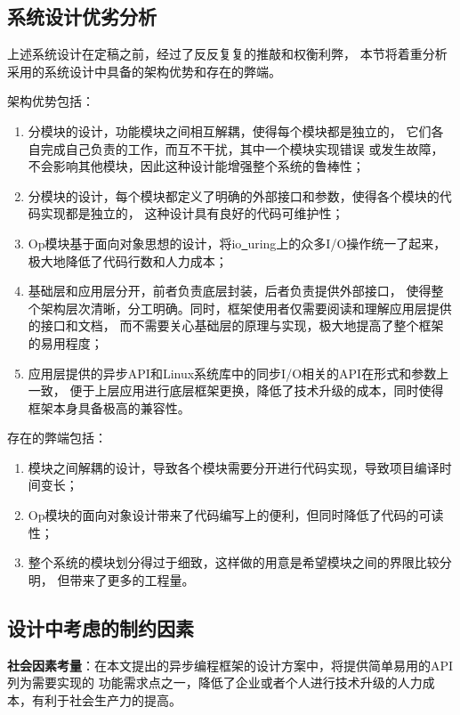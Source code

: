 \documentclass[supercite]{HustGraduPaper}
\theoremstyle{definition}
\begin{document}
\subsection{系统设计优劣分析}
上述系统设计在定稿之前，经过了反反复复的推敲和权衡利弊，
本节将着重分析采用的系统设计中具备的架构优势和存在的弊端。\par

架构优势包括：
\begin{enumerate}
  \item 分模块的设计，功能模块之间相互解耦，使得每个模块都是独立的，
    它们各自完成自己负责的工作，而互不干扰，其中一个模块实现错误
    或发生故障，不会影响其他模块，因此这种设计能增强整个系统的鲁棒性；
  \item 分模块的设计，每个模块都定义了明确的外部接口和参数，使得各个模块的代码实现都是独立的，
    这种设计具有良好的代码可维护性；
  \item Op模块基于面向对象思想的设计，将io\underline{~}uring上的众多I/O操作统一了起来，
    极大地降低了代码行数和人力成本；
  \item 基础层和应用层分开，前者负责底层封装，后者负责提供外部接口，
    使得整个架构层次清晰，分工明确。同时，框架使用者仅需要阅读和理解应用层提供的接口和文档，
    而不需要关心基础层的原理与实现，极大地提高了整个框架的易用程度；
  \item 应用层提供的异步API和Linux系统库中的同步I/O相关的API在形式和参数上一致，
    便于上层应用进行底层框架更换，降低了技术升级的成本，同时使得框架本身具备极高的兼容性。
\end{enumerate}

存在的弊端包括：
\begin{enumerate}
  \item 模块之间解耦的设计，导致各个模块需要分开进行代码实现，导致项目编译时间变长；
  \item Op模块的面向对象设计带来了代码编写上的便利，但同时降低了代码的可读性；
  \item 整个系统的模块划分得过于细致，这样做的用意是希望模块之间的界限比较分明，
    但带来了更多的工程量。
\end{enumerate}

\subsection{设计中考虑的制约因素}

\textbf{社会因素考量}：在本文提出的异步编程框架的设计方案中，将提供简单易用的API列为需要实现的
功能需求点之一，降低了企业或者个人进行技术升级的人力成本，有利于社会生产力的提高。\par
\end{document}
